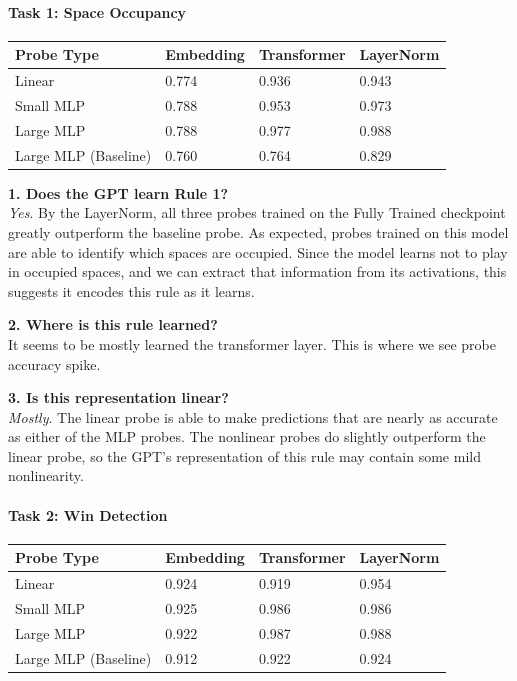 \documentclass[11pt]{article}
\begin{document}
    \paragraph{Task 1: Space Occupancy}\label{task-1-space-occupancy}

\begin{longtable}[]{@{}llll@{}}
\toprule\noalign{}
Probe Type & Embedding & Transformer & LayerNorm \\
\midrule\noalign{}
\endhead
\bottomrule\noalign{}
\endlastfoot
Linear & 0.774 & 0.936 & 0.943 \\
Small MLP & 0.788 & 0.953 & 0.973 \\
Large MLP & 0.788 & 0.977 & 0.988 \\
Large MLP (Baseline) & 0.760 & 0.764 & 0.829 \\
\end{longtable}

\textbf{1. Does the GPT learn Rule 1?}\\
\emph{Yes}. By the LayerNorm, all three probes trained on the Fully
Trained checkpoint greatly outperform the baseline probe. As expected,
probes trained on this model are able to identify which spaces are
occupied. Since the model learns not to play in occupied spaces, and we
can extract that information from its activations, this suggests it
encodes this rule as it learns.

\textbf{2. Where is this rule learned?}\\
It seems to be mostly learned the transformer layer. This is where we
see probe accuracy spike.

\textbf{3. Is this representation linear?}\\
\emph{Mostly}. The linear probe is able to make predictions that are
nearly as accurate as either of the MLP probes. The nonlinear probes do
slightly outperform the linear probe, so the GPT's representation of
this rule may contain some mild nonlinearity.

    \paragraph{Task 2: Win Detection}\label{task-2-win-detection}

\begin{longtable}[]{@{}llll@{}}
\toprule\noalign{}
Probe Type & Embedding & Transformer & LayerNorm \\
\midrule\noalign{}
\endhead
\bottomrule\noalign{}
\endlastfoot
Linear & 0.924 & 0.919 & 0.954 \\
Small MLP & 0.925 & 0.986 & 0.986 \\
Large MLP & 0.922 & 0.987 & 0.988 \\
Large MLP (Baseline) & 0.912 & 0.922 & 0.924 \\
\end{longtable}
\end{document}
